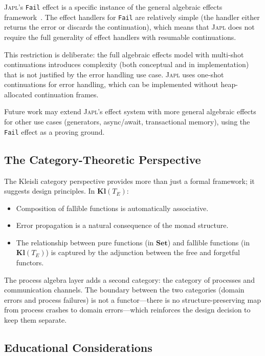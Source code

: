 \documentclass[11pt,twocolumn]{article}
\newcommand{\japl}{\textsc{Japl}}
\newcommand{\Fail}{\texttt{Fail}}
\newcommand{\Kleisli}{\mathbf{Kl}}
\newcommand{\Set}{\ensuremath{\mathbf{Set}}}
\begin{document}
\japl{}'s \Fail{} effect is a specific instance of the general algebraic effects framework~\cite{plotkin2009handlers,plotkin2013handling}. The effect handlers for \Fail{} are relatively simple (the handler either returns the error or discards the continuation), which means that \japl{} does not require the full generality of effect handlers with resumable continuations.

This restriction is deliberate: the full algebraic effects model with multi-shot continuations introduces complexity (both conceptual and in implementation) that is not justified by the error handling use case. \japl{} uses one-shot continuations for error handling, which can be implemented without heap-allocated continuation frames.

Future work may extend \japl{}'s effect system with more general algebraic effects for other use cases (generators, async/await, transactional memory), using the \Fail{} effect as a proving ground.

\subsection{The Category-Theoretic Perspective}

The Kleisli category perspective provides more than just a formal framework; it suggests design principles. In $\Kleisli(T_E)$:

\begin{itemize}[leftmargin=*]
  \item Composition of fallible functions is automatically associative.
  \item Error propagation is a natural consequence of the monad structure.
  \item The relationship between pure functions (in \Set{}) and fallible functions (in $\Kleisli(T_E)$) is captured by the adjunction between the free and forgetful functors.
\end{itemize}

The process algebra layer adds a second category: the category of processes and communication channels. The boundary between the two categories (domain errors and process failures) is not a functor---there is no structure-preserving map from process crashes to domain errors---which reinforces the design decision to keep them separate.

\subsection{Educational Considerations}
\end{document}
